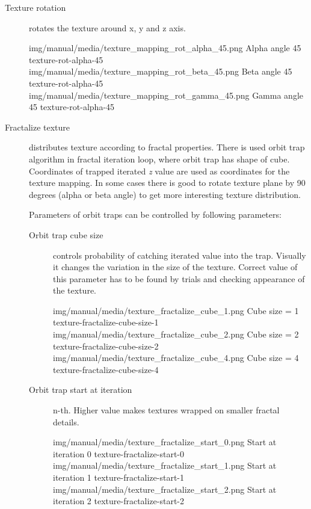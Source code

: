 \begin{description}
	 \item[Texture rotation] rotates the texture around x, y and z axis.
	 
	 \threeImagesWithTwoCaptionsFullWidth
	 {img/manual/media/texture_mapping_rot_alpha_45.png}
	 {Alpha angle 45\textdegree}
	 {texture-rot-alpha-45}
	 {img/manual/media/texture_mapping_rot_beta_45.png}
	 {Beta angle 45\textdegree}
	 {texture-rot-alpha-45}
	 {img/manual/media/texture_mapping_rot_gamma_45.png}
	 {Gamma angle 45\textdegree}
	 {texture-rot-alpha-45}
	 
	 \item[Fractalize texture] distributes texture according to fractal properties. There is used orbit trap algorithm in fractal iteration loop, where orbit trap has shape of cube. Coordinates of trapped iterated \emph{z} value are used as coordinates for the texture mapping. In some cases there is good to rotate texture plane by 90 degrees (alpha or beta angle) to get more interesting texture distribution.
	 
	 Parameters of orbit traps can be controlled by following parameters:
	 
	 \begin{description}
	 	\item[Orbit trap cube size] controls probability of catching iterated value into the trap. Visually it changes the variation in the size of the texture. Correct value of this parameter has to be found by trials and checking appearance of the texture.
	 	
	 	\threeImagesWithTwoCaptionsFullWidth
	 	{img/manual/media/texture_fractalize_cube_1.png}
	 	{Cube size = 1}
	 	{texture-fractalize-cube-size-1}
	 	{img/manual/media/texture_fractalize_cube_2.png}
	 	{Cube size = 2}
		{texture-fractalize-cube-size-2}
	 	{img/manual/media/texture_fractalize_cube_4.png}
	 	{Cube size = 4}
	 	{texture-fractalize-cube-size-4}
	 	
	 	\item[Orbit trap start at iteration] n-th. Higher value makes textures wrapped on smaller fractal details.
	 	
	 	\threeImagesWithTwoCaptionsFullWidth
	 	{img/manual/media/texture_fractalize_start_0.png}
	 	{Start at iteration 0}
	 	{texture-fractalize-start-0}
	 	{img/manual/media/texture_fractalize_start_1.png}
	 	{Start at iteration 1}
	 	{texture-fractalize-start-1}
	 	{img/manual/media/texture_fractalize_start_2.png}
	 	{Start at iteration 2}
	 	{texture-fractalize-start-2}
	 	
	 \end{description}
	 
	 
	
 \end{description}




